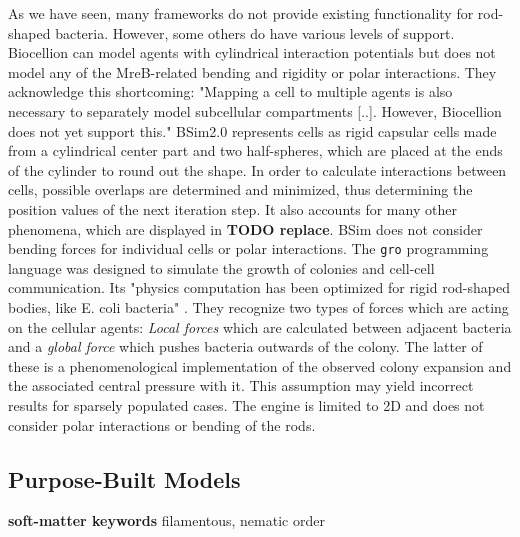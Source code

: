 \documentclass{article}
\begin{document}
As we have seen, many frameworks do not provide existing functionality for rod-shaped bacteria.
However, some others do have various levels of support.
Biocellion \cite{Kang2014} can model agents with cylindrical interaction potentials but does not
model any of the MreB-related bending and rigidity or polar interactions.
They acknowledge this shortcoming: "Mapping a cell to multiple agents is also necessary to
separately model subcellular compartments [..].
However, Biocellion does not yet support this." \cite{Kang2014}
BSim2.0 represents cells as rigid capsular cells made from a cylindrical center part and two
half-spheres, which are placed at the ends of the cylinder to round out the shape.
In order to calculate interactions between cells, possible overlaps are determined and minimized,
thus determining the position values of the next iteration step.
It also accounts for many other phenomena, which are displayed in \textbf{TODO replace}.
BSim does not consider bending forces for individual cells or polar interactions.
The \texttt{gro} programming language was designed to simulate the growth of colonies and cell-cell
communication.
Its "physics computation has been optimized for rigid rod-shaped bodies, like E. coli bacteria"
\cite{Gutirrez2017}.
They recognize two types of forces which are acting on the cellular agents:
\textit{Local forces} which are calculated between adjacent bacteria and a \textit{global force}
which pushes bacteria outwards of the colony.
The latter of these is a phenomenological implementation of the observed colony expansion and the
associated central pressure with it.
This assumption may yield incorrect results for sparsely populated cases.
The engine is limited to 2D and does not consider polar interactions or bending of the rods.

\subsection{Purpose-Built Models}

\textbf{soft-matter keywords}
filamentous, nematic order
\end{document}
